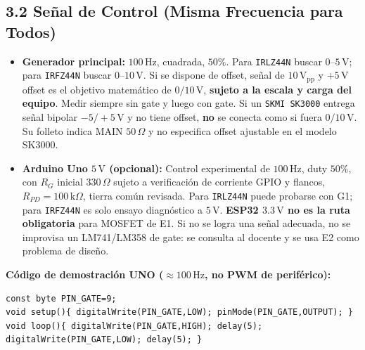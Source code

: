 \documentclass[10pt, a4paper, landscape]{article}
\begin{document}
\subsection*{3.2 Señal de Control (Misma Frecuencia para Todos)}
\begin{itemize}[noitemsep, topsep=2pt]
    \item \textbf{Generador principal:} $100\,\text{Hz}$, cuadrada, $50\%$. Para \texttt{IRLZ44N} buscar \textbf{$0\text{--}5\,\text{V}$}; para \texttt{IRFZ44N} buscar \textbf{$0\text{--}10\,\text{V}$}. Si se dispone de offset, señal de $10\,\text{V}_{\text{pp}}$ y $+5\,\text{V}$ offset es el objetivo matemático de $0/10\,\text{V}$, \textbf{sujeto a la escala y carga del equipo}. Medir siempre sin gate y luego con gate. Si un \texttt{SKMI SK3000} entrega señal bipolar $-5/+5\,\text{V}$ y no tiene offset, \textbf{no} se conecta como si fuera $0/10\,\text{V}$. Su folleto indica MAIN $50\,\Omega$ y no especifica offset ajustable en el modelo SK3000.
    \item \textbf{Arduino Uno $5\,\text{V}$ (opcional):} Control experimental de $100\,\text{Hz}$, duty $50\%$, con $R_G$ inicial \textbf{$330\,\Omega$} sujeto a verificación de corriente GPIO y flancos, $R_{PD}=100\,\text{k}\Omega$, tierra común revisada. Para \texttt{IRLZ44N} puede probarse con G1; para \texttt{IRFZ44N} es solo ensayo diagnóstico a $5\,\text{V}$. \textbf{ESP32 $3.3\,\text{V}$ no es la ruta obligatoria} para MOSFET de E1. Si no se logra una señal adecuada, no se improvisa un LM741/LM358 de gate: se consulta al docente y se usa E2 como problema de diseño.
\end{itemize}

\noindent\textbf{Código de demostración UNO ($\approx 100\,\text{Hz}$, no PWM de periférico):}
\begin{verbatim}
const byte PIN_GATE=9;
void setup(){ digitalWrite(PIN_GATE,LOW); pinMode(PIN_GATE,OUTPUT); }
void loop(){ digitalWrite(PIN_GATE,HIGH); delay(5); digitalWrite(PIN_GATE,LOW); delay(5); }
\end{verbatim}
\end{document}
